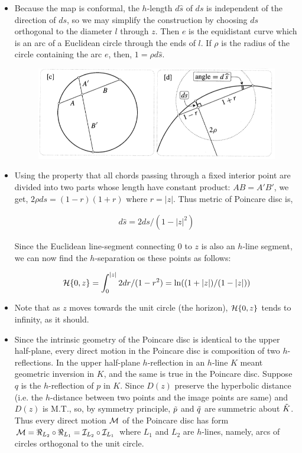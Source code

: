 \documentclass[12pt]{article}
\def\mc{\ensuremath\mathcal}
\def\td{\ensuremath\tilde}
\begin{document}
\begin{itemize}
    \item Because the map is conformal, the $h$-length $d\hat{s}$ of $ds$ is independent of the direction of $ds$, so we may simplify the construction by choosing $ds$ orthogonal to the diameter $l$ through $z$. Then $e$ is the equidistant curve which is an arc of a Euclidean circle through the ends of $l$. If $\rho$ is the radius of the circle containing the arc $e$, then, $1 = \rho d\hat{s}$.

    \begin{figure}[h!]
        \centering
        \includegraphics[scale=0.7]{fig_31}
        \label{fig_31}
    \end{figure}

    \item Using the property that all chords passing through a fixed interior point are divided into two parts whose length have constant product: $AB = A'B'$, we get, $2\rho ds = (1-r)(1+r)$ where $r=|z|$. Thus metric of Poincare disc is,

    \begin{align*}
        d\hat{s} = 2ds/(1-|z|^2)
    \end{align*}

    Since the Euclidean line-segment connecting $0$ to $z$ is also an $h$-line segment, we can now find the $h$-separation os these points as follows:

    \begin{align*}
        \mc{H}\{0,z\} = \int_{0}^{|z|}2dr/(1-r^2) = \ln((1+|z|)/(1-|z|))
    \end{align*}

    \item Note that as $z$ moves towards the unit circle (the horizon), $\mc{H}\{0,z\}$ tends to infinity, as it should.

    \item Since the intrinsic geometry of the Poincare disc is identical to the upper half-plane, every direct motion in the Poincare disc is composition of two $h$-reflections. In the upper half-plane $h$-reflection in an $h$-line $K$ meant geometric inversion in $K$, and the same is true in the Poincare disc. Suppose $q$ is the $h$-reflection of $p$ in $K$. Since $D(z)$ preserve the hyperbolic distance (i.e. the $h$-distance between two points and the image points are same) and $D(z)$ is M.T., so, by symmetry principle, $\td{p}$ and $\td{q}$ are summetric about $\td{K}$. Thus every direct motion $\mc{M}$ of the Poincare disc has form $\mc{M} = \Re_{L_2} \circ \Re_{L_1} = \mc{I}_{L_2} \circ \mc{I}_{L_1}$ where $L_1$ and $L_2$ are $h$-lines, namely, arcs of circles orthogonal to the unit circle.


\end{itemize}
\end{document}
